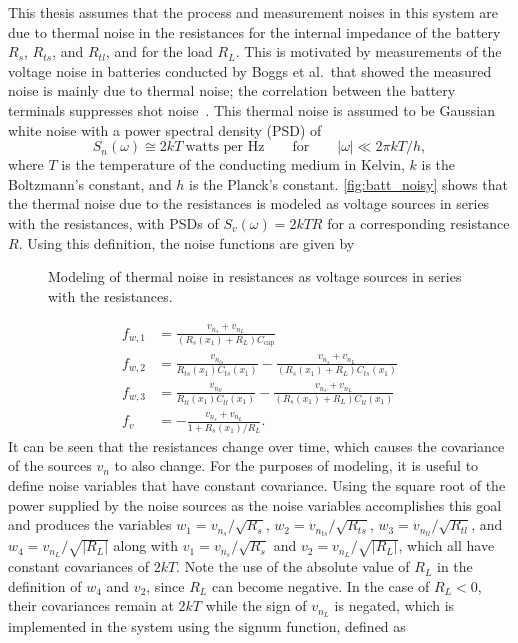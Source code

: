 \documentclass[../zhang_thesis.tex]{subfiles}
\begin{document}
This thesis assumes that the process and measurement noises in this system are due to thermal noise in the resistances for the internal impedance of the battery $R_s$, $R_{ts}$, and $R_{tl}$, and for the load $R_L$. This is motivated by measurements of the voltage noise in batteries conducted by Boggs et al.\ that showed the measured noise is mainly due to thermal noise; the correlation between the battery terminals suppresses shot noise~\cite{boggs95}. This thermal noise is assumed to
be Gaussian white noise with a power spectral density (PSD) of~\cite{stremler82}
\begin{equation}
    S_n(\omega) \cong 2kT\ \text{watts per Hz} \qquad \text{for} \qquad |\omega| \ll 2\pi kT/h,
\end{equation}
where $T$ is the temperature of the conducting medium in Kelvin, $k$ is the Boltzmann's constant, and $h$ is the Planck's constant. \autoref{fig:batt_noisy} shows that the thermal noise due to the resistances is modeled as voltage sources in series with the resistances, with PSDs of $S_v(\omega)=2kTR$ for a corresponding resistance $R$. Using this definition, the noise functions are given by
\begin{figure}[tb]

\caption{Modeling of thermal noise in resistances as voltage sources in series with the resistances.}
\label{fig:batt_noisy}
\end{figure}
\begin{align}
    f_{w,1} &= \frac{v_{n_s}+v_{n_L}}{(R_s(x_1)+R_L)C_\text{cap}} \\
    f_{w,2} &= \frac{v_{n_{ts}}}{R_{ts}(x_1)C_{ts}(x_1)} - \frac{v_{n_s}+v_{n_L}}{(R_s(x_1)+R_L)C_{ts}(x_1)} \\
    f_{w,3} &= \frac{v_{n_{tl}}}{R_{tl}(x_1)C_{tl}(x_1)} - \frac{v_{n_s}+v_{n_L}}{(R_s(x_1)+R_L)C_{tl}(x_1)} \\
    f_v &= - \frac{v_{n_s}+v_{n_L}}{1+R_s(x_1)/R_L}.
\end{align}
It can be seen that the resistances change over time, which causes the covariance of the sources $v_n$ to also change. For the purposes of modeling, it is useful to define noise variables that have constant covariance. Using the square root of the power supplied by the noise sources as the noise variables accomplishes this goal and produces the variables $w_1=v_{n_s}/\sqrt{R_s}$, $w_2=v_{n_{ts}}/\sqrt{R_{ts}}$, $w_3=v_{n_{tl}}/\sqrt{R_{tl}}$, and $w_4=v_{n_L}/\sqrt{|R_L|}$ along with
$v_1=v_{n_s}/\sqrt{R_s}$ and $v_2=v_{n_L}/\sqrt{|R_L|}$, which all have
constant covariances of $2kT$. Note the use of the absolute value of $R_L$ in the definition of $w_4$ and $v_2$, since $R_L$ can become negative. In the case of $R_L<0$, their covariances remain at $2kT$ while the sign of $v_{n_L}$ is negated, which is implemented in the system using the signum function, defined as
\end{document}
